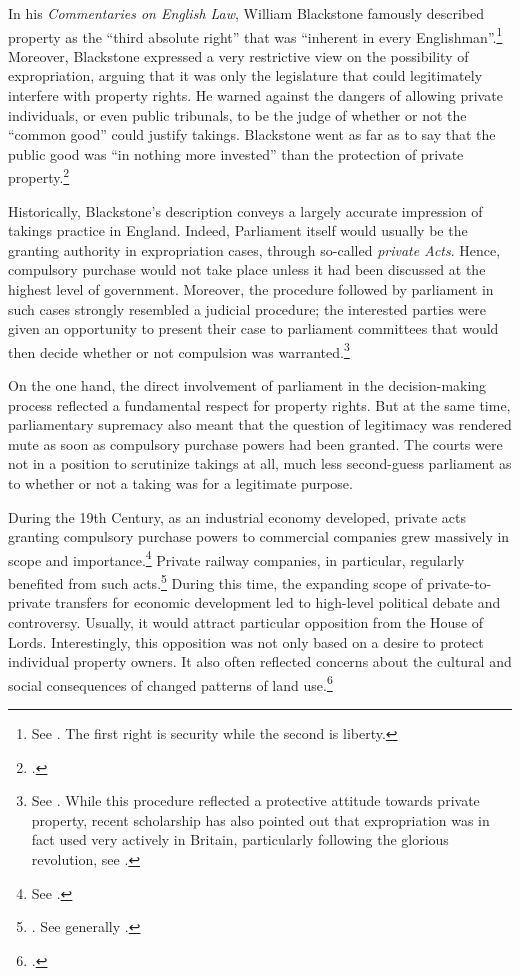 In his {\it Commentaries on English Law}, William Blackstone famously described property as the ``third absolute right'' that was ``inherent in every Englishman''.\footnote{See \cite[134-135]{blackstone79}. The first right is security while the second is liberty.}  Moreover, Blackstone expressed a very restrictive view on the possibility of expropriation, arguing that it was only the legislature that could legitimately interfere with property rights. He warned against the dangers of allowing private individuals, or even public tribunals, to be the judge of whether or not the ``common good'' could justify takings. Blackstone went as far as to say that the public good was ``in nothing more invested'' than the protection of private property.\footcite[134-135]{blackstone79}

Historically, Blackstone's description conveys a largely accurate impression of takings practice in England. Indeed, Parliament itself would usually be the granting authority in expropriation cases, through so-called {\it private Acts}. Hence, compulsory purchase would not take place unless it had been discussed at the highest level of government. Moreover, the procedure followed by parliament in such cases strongly resembled a judicial procedure; the interested parties were given an opportunity to present their case to parliament committees that would then decide whether or not compulsion was warranted.\footnote{See \cite[13-16]{allen00}. While this procedure reflected a protective attitude towards private property, recent scholarship has also pointed out that expropriation was in fact used very actively in Britain, particularly following the glorious revolution, see \cite{hoppit11}.}

On the one hand, the direct involvement of parliament in the decision-making process reflected a fundamental respect for property rights. But at the same time, parliamentary supremacy also meant that the question of legitimacy was rendered mute as soon as compulsory purchase powers had been granted. The courts were not in a position to scrutinize takings at all, much less second-guess parliament as to whether or not a taking was for a legitimate purpose.

During the 19th Century, as an industrial economy developed, private acts granting compulsory purchase powers to commercial companies grew massively in scope and importance.\footnote{See \cite[204]{allen00}.} Private railway companies, in particular, regularly benefited from such acts.\footnote{\cite[204]{allen00}. See generally \cite{kostal97}.} During this time, the expanding scope of private-to-private transfers for economic development led to high-level political debate and controversy. Usually, it would attract particular opposition from the House of Lords. Interestingly, this opposition was not only based on a desire to protect individual property owners. It also often reflected concerns about the cultural and social consequences of changed patterns of land use.\footcite[204]{allen00} 

